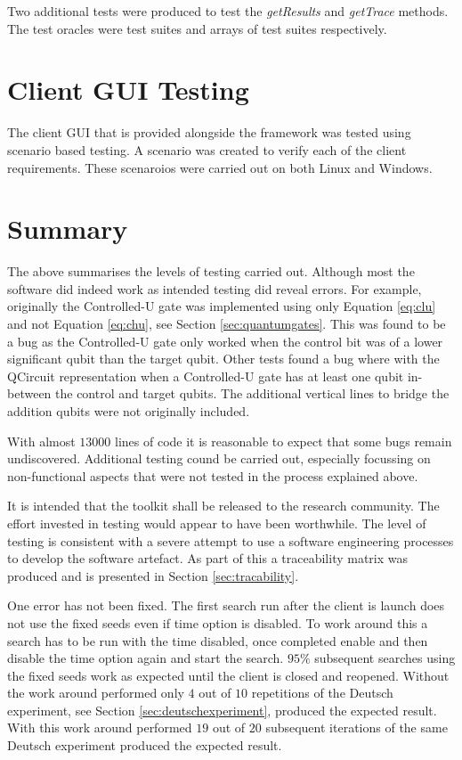 Two additional tests were produced to test the \emph{getResults} and \emph{getTrace} methods.
The test oracles were test suites and arrays of test suites respectively.

\section{Client GUI Testing}
\label{sec:clientguitests}
The client GUI that is provided alongside the framework was tested using scenario based testing.
A scenario was created to verify each of the client requirements.
These scenaroios were carried out on both Linux and Windows.

\section{Summary}

The above summarises the levels of testing carried out.
Although most the software did indeed work as intended testing did reveal errors.
For example, originally the Controlled-U gate was implemented using only Equation \ref{eq:clu} and not Equation \ref{eq:chu}, see Section \ref{sec:quantumgates}.
This was found to be a bug as the Controlled-U gate only worked when the control bit was of a lower significant qubit than the target qubit.
Other tests found a bug where with the QCircuit representation when a Controlled-U gate has at least one qubit in-between the control and target qubits.
The additional vertical lines to bridge the addition qubits were not originally included.

With almost $13000$ lines of code it is reasonable to expect that some bugs remain undiscovered.
Additional testing cound be carried out, especially focussing on non-functional aspects that were not tested in the process explained above.

It is intended that the toolkit shall be released to the research community.
The effort invested in testing would appear to have been worthwhile.
The level of testing is consistent with a severe attempt to use a software engineering processes to develop the software artefact.
As part of this a traceability matrix was produced and is presented in Section \ref{sec:tracability}.

One error has not been fixed.
The first search run after the client is launch does not use the fixed seeds even if time option is disabled.
To work around this a search has to be run with the time disabled, once completed enable and then disable the time option again and start the search.
$95\%$ subsequent searches using the fixed seeds work as expected until the client is closed and reopened.
Without the work around performed only $4$ out of $10$ repetitions of the Deutsch experiment, see Section \ref{sec:deutschexperiment}, produced the expected result.
With this work around performed $19$ out of $20$ subsequent iterations of the same Deutsch experiment produced the expected result.

